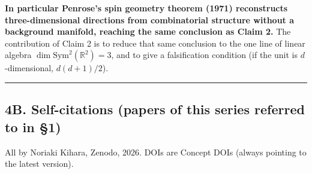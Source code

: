 \documentclass[
  10pt,
]{article}
\begin{document}
\textbf{In particular Penrose's spin geometry theorem (1971)
reconstructs three-dimensional directions from combinatorial structure
without a background manifold, reaching the same conclusion as Claim 2.}
The contribution of Claim 2 is to reduce that same conclusion to the one
line of linear algebra \(\dim\mathrm{Sym}^2(\mathbb{R}^2) = 3\), and to
give a falsification condition (if the unit is \(d\)-dimensional,
\(d(d+1)/2\)).

\begin{center}\rule{0.5\linewidth}{0.5pt}\end{center}

\subsection{4B. Self-citations (papers of this series referred to in
§1)}\label{b.-self-citations-papers-of-this-series-referred-to-in-1}

All by Noriaki Kihara, Zenodo, 2026. DOIs are Concept DOIs (always
pointing to the latest version).
\end{document}
